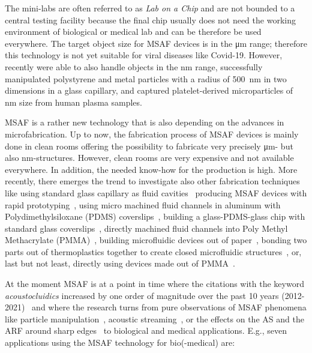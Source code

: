 The mini-labs are often referred to as \emph{Lab on a Chip} and are not bounded 
to a central testing facility because the final chip usually does not need the 
working environment of biological or medical lab and can be therefore be used 
everywhere. The target object size for MSAF devices is in the \si{\um} range; 
therefore this technology is not yet suitable for viral diseases like Covid-19. 
However, recently  were able to also handle objects in the 
\si{\nano\meter} range,  successfully manipulated polystyrene 
and metal particles with a radius of \SI{500}{\nm} in two dimensions in a glass 
capillary, and  captured platelet-derived microparticles of 
\si{\nm} size from human plasma samples.

MSAF is a rather new technology that is also depending on the advances in 
microfabrication. Up to now, the fabrication process of MSAF devices is mainly 
done in clean rooms offering the possibility to fabricate very precisely 
\si{\um}- but also \si{\nm}-structures. However, clean rooms are very expensive 
and not available everywhere. In addition, the needed know-how for the 
production is high. More recently, there emerges the trend to investigate also 
other fabrication techniques like using standard glass capillary as fluid 
cavities~\cite{Wiklund2001,Hammarstrom2010,Hammarstrom2012,Mishra2014,Gralinski2014,Gerlt2022} 
producing MSAF devices with rapid prototyping~\cite{Adams2012}, using micro 
machined fluid channels in aluminum with Polydimethylsiloxane (PDMS) 
coverslips~\cite{Gautam2018}, building a glass-PDMS-glass chip with standard 
glass coverslips~\cite{Xu2019}, directly machined fluid channels into Poly 
Methyl Methacrylate (PMMA)~\cite{Harris2012}, building microfluidic devices out 
of paper~\cite{Martinez2010}, bonding two parts out of thermoplastics together 
to create closed microfluidic structures~\cite{Mueller2013}, or, last but not 
least, directly using devices made out of PMMA~\cite{Gonzalez2015,Yang2017}.

At the moment MSAF is at a point in time where the citations with the keyword 
\emph{acoustocluidics} increased by one order of magnitude over the past 10 
years (2012-2021)~\cite{Novotny2021} and where the research turns from pure 
observations of MSAF phenomena like particle 
manipulation~\cite{Wiklund2012a,Laurell2007,Collins2016,Gedge2012,Ding2012b,Cetin2016b,Aubert2016,Novotny2021}, 
acoustic streaming~\cite{Hoyos2013,Castro2016,Lei2016}, or the effects on the 
AS and the ARF around sharp 
edges~\cite{Leibacher2015,Chen2021,Doinikov2020,Doinikov2020b} to biological 
and medical applications. E.g., seven applications using the MSAF technology 
for bio(-medical) are:

